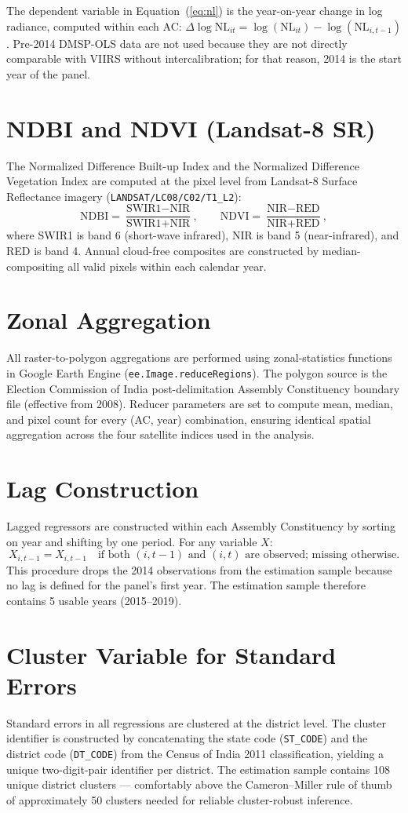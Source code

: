 \documentclass[12pt,a4paper,oneside]{report}
\begin{document}
The dependent variable in Equation~(\ref{eq:nl}) is the year-on-year change in log radiance, computed within each AC: $\Delta \log \text{NL}_{it} = \log(\text{NL}_{it}) - \log(\text{NL}_{i,t-1})$. Pre-2014 DMSP-OLS data are not used because they are not directly comparable with VIIRS without intercalibration; for that reason, 2014 is the start year of the panel.

\section{NDBI and NDVI (Landsat-8 SR)}
The Normalized Difference Built-up Index and the Normalized Difference Vegetation Index are computed at the pixel level from Landsat-8 Surface Reflectance imagery (\texttt{LANDSAT/LC08/C02/T1\_L2}):
\[
\text{NDBI} = \frac{\text{SWIR1} - \text{NIR}}{\text{SWIR1} + \text{NIR}}, \qquad
\text{NDVI} = \frac{\text{NIR} - \text{RED}}{\text{NIR} + \text{RED}},
\]
where SWIR1 is band 6 (short-wave infrared), NIR is band 5 (near-infrared), and RED is band 4. Annual cloud-free composites are constructed by median-compositing all valid pixels within each calendar year.

\section{Zonal Aggregation}
All raster-to-polygon aggregations are performed using zonal-statistics functions in Google Earth Engine (\texttt{ee.Image.reduceRegions}). The polygon source is the Election Commission of India post-delimitation Assembly Constituency boundary file (effective from 2008). Reducer parameters are set to compute mean, median, and pixel count for every (AC, year) combination, ensuring identical spatial aggregation across the four satellite indices used in the analysis.

\section{Lag Construction}
Lagged regressors are constructed within each Assembly Constituency by sorting on year and shifting by one period. For any variable $X$:
\[
X_{i,t-1} = X_{i, t-1} \quad \text{if both } (i, t-1) \text{ and } (i, t) \text{ are observed; missing otherwise}.
\]
This procedure drops the 2014 observations from the estimation sample because no lag is defined for the panel's first year. The estimation sample therefore contains 5 usable years (2015--2019).

\section{Cluster Variable for Standard Errors}
Standard errors in all regressions are clustered at the district level. The cluster identifier is constructed by concatenating the state code (\texttt{ST\_CODE}) and the district code (\texttt{DT\_CODE}) from the Census of India 2011 classification, yielding a unique two-digit-pair identifier per district. The estimation sample contains 108 unique district clusters --- comfortably above the Cameron--Miller rule of thumb of approximately 50 clusters needed for reliable cluster-robust inference.
\end{document}
